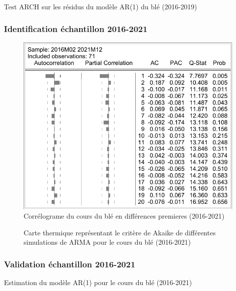 \documentclass[12pt,a4paper]{article}
\begin{document}
\begin{table}[H]
    \centering
    \caption{Test ARCH sur les résidus du modèle AR(1) du blé (2016-2019)}
    \sffamily
    \resizebox{0.6\textwidth}{!}{}
\end{table}

\subsubsection{Identification échantillon 2016-2021}
\begin{figure}[H]
    \centering
    \includegraphics[]{annexe/4_3_2_cor_dble21.pdf}
    \caption{Corrélograme du cours du blé en différences premieres (2016-2021)}
    \label{fig:cor_dble21}
\end{figure}

\begin{figure}[H]
    \centering
    \resizebox{\textwidth}{!}{}
    \caption{Carte thermique représentant le critère de Akaike de différentes simulations de ARMA pour le cours du blé (2016-2021)}
    \label{fig:arma_heatmap_21}
\end{figure}

\subsubsection{Validation échantillon 2016-2021}\label{appendix:valid21}
\begin{table}[H]
    \centering
    \caption{Estimation du modèle AR(1) pour le cours du blé (2016-2021)}
    \sffamily
    \resizebox{0.8\textwidth}{!}{}

\end{table}
\end{document}
